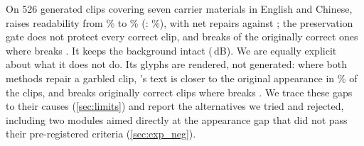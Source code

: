 On 526 generated clips covering seven carrier materials in English and Chinese, \method raises readability from \rOrigRead\% to \rOursRead\% (\steer: \rSteerRead\%), with \rOursNet{} net repairs against \rSteerNet; the preservation gate does not protect every correct clip, and \method breaks \rOursBroken{} of the \rOrigCorrect{} originally correct ones where \steer breaks \rSteerBroken. It keeps the background intact (\rOursBG\,dB). We are equally explicit about what it does not do. Its glyphs are rendered, not generated: where both methods repair a garbled clip, \steer's text is closer to the original appearance in \rSteerCloserPct\% of the clips, and \method breaks \rOursBroken{} originally correct clips where \steer breaks \rSteerBroken. We trace these gaps to their causes (\cref{sec:limits}) and report the alternatives we tried and rejected, including two modules aimed directly at the appearance gap that did not pass their pre-registered criteria (\cref{sec:exp_neg}).

